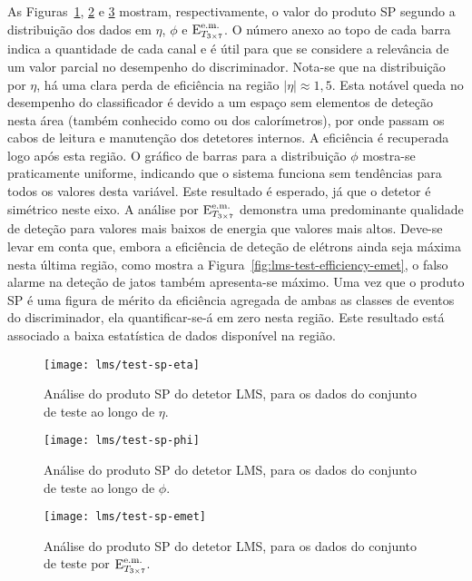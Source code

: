 As Figuras~\ref{fig:lms-test-sp-eta}, \ref{fig:lms-test-sp-phi} e
\ref{fig:lms-test-sp-emet} mostram, respectivamente, o valor do produto SP segundo
a distribuição dos dados em $\eta$, $\phi$ e $\text{E}^{\text{e.m.}}_{T_{3\times7}}$. O número anexo ao topo
de cada barra indica a quantidade de cada canal e é útil para que se considere
a relevância de um valor parcial no desempenho do discriminador. Nota-se que
na distribuição por $\eta$, há uma clara perda de eficiência na região
$|\eta| \approx 1,5$. Esta notável queda no desempenho do classificador é
devido a um espaço sem elementos de deteção nesta área (também conhecido como
 ou  dos calorímetros), por onde passam os cabos de
leitura e manutenção dos detetores internos. A eficiência é recuperada logo
após esta região. O gráfico de barras para a distribuição $\phi$ mostra-se
praticamente uniforme, indicando que o sistema funciona sem tendências para
todos os valores desta variável. Este resultado é esperado, já que o detetor é
simétrico neste eixo. A análise por $\text{E}^{\text{e.m.}}_{T_{3\times7}}$ demonstra uma predominante
qualidade de deteção para valores mais baixos de energia que valores mais
altos. Deve-se levar em conta que, embora a eficiência de deteção de elétrons
ainda seja máxima nesta última região, como mostra a
Figura~\ref{fig:lms-test-efficiency-emet}, o falso alarme na deteção de jatos
também apresenta-se máximo. Uma vez que o produto SP é uma figura de mérito da
eficiência agregada de ambas as classes de eventos do discriminador, ela
quantificar-se-á em zero nesta região. Este resultado está associado a baixa
estatística de dados disponível na região.

\begin{figure}
\begin{center}
\texttt{[image: lms/test-sp-eta]}
\end{center}
\caption{Análise do produto SP do detetor LMS, para os dados do conjunto de
teste ao longo de $\eta$.}
\label{fig:lms-test-sp-eta}
\end{figure}

\begin{figure}
\begin{center}
\texttt{[image: lms/test-sp-phi]}
\end{center}
\caption{Análise do produto SP do detetor LMS, para os dados do conjunto de
teste ao longo de $\phi$.} 
\label{fig:lms-test-sp-phi}
\end{figure}

\begin{figure}
\begin{center}
\texttt{[image: lms/test-sp-emet]}
\end{center}
\caption{Análise do produto SP do detetor LMS, para os dados do conjunto de
teste por $\text{E}^{\text{e.m.}}_{T_{3\times7}}$.} 
\label{fig:lms-test-sp-emet}
\end{figure}

